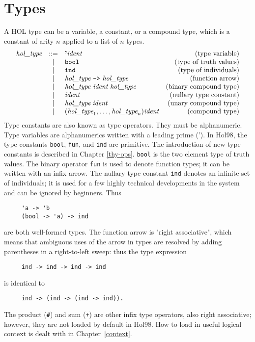 \documentclass[12pt,fleqn,a4paper]{report}
\newcommand{\ident}      {\mbox{\it ident}}
\newcommand{\type}       {\mbox{\it hol\_type}}
\begin{document}
\section{Types}

A HOL type can be a variable, a constant, or a compound type, which is
a constant of arity $n$ applied to a list of $n$ types.
\[
\begin{array}{rclr}
  \type & ::= & \mbox{\bf '}\ident & \mbox{(type variable)} \\
  & | &  \verb+bool+ & \mbox{(type of truth values)} \\
  & | &  \verb+ind+ & \mbox{(type of individuals)} \\
  & | &  \type\ \verb+->+\ \type & \mbox{(function arrow)} \\
  & | &  \type\ \ident\ \type\ & \mbox{(binary compound type)}\\
  & | &  \ident & \mbox{(nullary type constant)} \\
  & | & \type\; \ident & \mbox{(unary compound type)} \\
  & | & (\type_1,\ldots,\type_n) \ident & \mbox{(compound type)}
\end{array}
\]
Type constants are also known as type operators. They must be
alphanumeric. Type variables are alphanumerics written with a leading
prime ('). In Hol98, the type constants {\tt bool}, {\tt fun}, and
{\tt ind} are primitive. The introduction of new type constants is
described in Chapter \ref{thy-ops}. {\tt bool} is the two element type
of truth values. The binary operator {\tt fun} is used to denote
function types; it can be written with an infix arrow. The nullary
type constant {\tt ind} denotes an infinite set of individuals; it is
used for a few highly technical developments in the system and can be
ignored by beginners.  Thus
\begin{verbatim}
     'a -> 'b
     (bool -> 'a) -> ind
\end{verbatim}
are both well-formed types. The function arrow is "right associative",
which means that ambiguous uses of the arrow in types are resolved by
adding parentheses in a right-to-left sweep: thus the type expression
\begin{verbatim}
     ind -> ind -> ind -> ind
\end{verbatim}
is identical to
\begin{verbatim}
     ind -> (ind -> (ind -> ind)).
\end{verbatim}
The product (\verb+#+) and sum (\verb!+!) are other infix type
operators, also right associative; however, they are not loaded by
default in Hol98. How to load in useful logical context is dealt with
in Chapter~\ref{context}.
\end{document}
